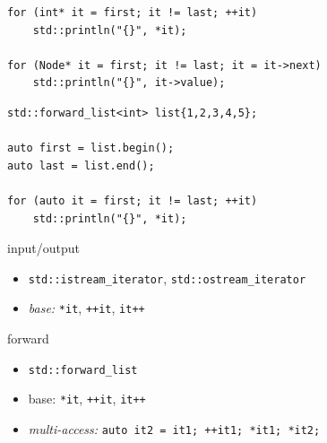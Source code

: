 \documentclass[aspectratio=169]{beamer}
\begin{document}
\begin{frame}[fragile,c]{}
\Large
\begin{center}
\begin{verbatim}
for (int* it = first; it != last; ++it)
    std::println("{}", *it);

for (Node* it = first; it != last; it = it->next)
    std::println("{}", it->value);
\end{verbatim}
\end{center}
\end{frame}

\begin{frame}[fragile,c]{}
\Large
\begin{center}
\begin{verbatim}
std::forward_list<int> list{1,2,3,4,5};

auto first = list.begin();
auto last = list.end();

for (auto it = first; it != last; ++it)
    std::println("{}", *it);
\end{verbatim}
\end{center}
\let\thefootnote\relax{}
\end{frame}

\begin{frame}[fragile]{input/output}
    \begin{itemize}
        \item \texttt{std::istream_iterator}, \texttt{std::ostream_iterator}
    \end{itemize}
    \begin{itemize}
        \item \emph{base:} \texttt{*it}, \texttt{++it}, \texttt{it++}
    \end{itemize}
\end{frame}

\begin{frame}[fragile]{forward}
    \begin{itemize}
        \item \texttt{std::forward_list}
    \end{itemize}
    \begin{itemize}
        \item base: \texttt{*it}, \texttt{++it}, \texttt{it++}
        \item \emph{multi-access:} \texttt{auto it2 = it1; ++it1; *it1; *it2;}
    \end{itemize}
\end{frame}
\end{document}
